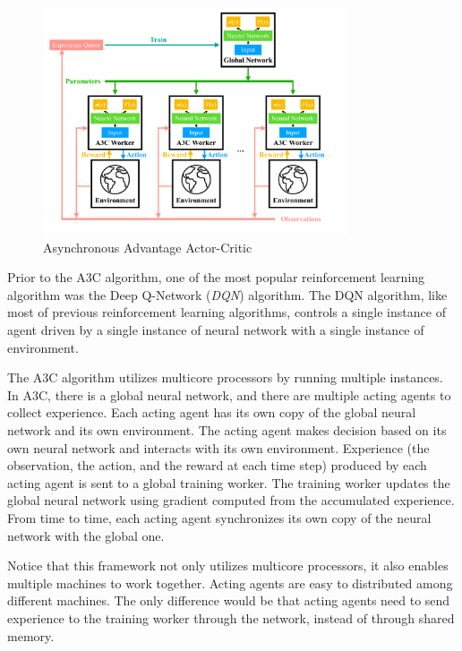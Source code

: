        \begin{figure}[htp]
            \centering
            \includegraphics[width=0.8\textwidth]{img/a3c.pdf}
            \caption{Asynchronous Advantage Actor-Critic}
            \label{fig:a3c}
        \end{figure}

        Prior to the A3C algorithm, one of the most popular reinforcement learning algorithm was
        the Deep Q-Network (\emph{DQN}) algorithm. \cite{mnih_human-level_2015}
        The DQN algorithm, like most of previous reinforcement learning algorithms,
        controls a single instance of agent driven by a single instance of neural network
        with a single instance of environment.

        The A3C algorithm utilizes multicore processors by running multiple instances.
        In A3C, there is a global neural network,
        and there are multiple acting agents to collect experience.
        Each acting agent has its own copy of the global neural network and its own environment.
        The acting agent makes decision based on its own neural network and interacts with its own environment.
        Experience (the observation, the action, and the reward at each time step) produced by each acting agent
        is sent to a global training worker.
        The training worker updates the global neural network using gradient computed from the accumulated experience.
        From time to time, each acting agent synchronizes its own copy of the neural network with the global one.

        Notice that this framework not only utilizes multicore processors,
        it also enables multiple machines to work together.
        Acting agents are easy to distributed among different machines.
        The only difference would be that acting agents need to send experience to the training worker
        through the network, instead of through shared memory.

